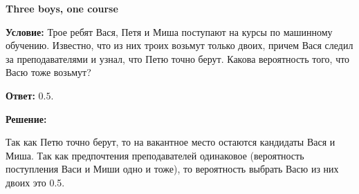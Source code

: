 \documentclass{exam}
\begin{document}
    
\textbf{Three boys, one course}

\textbf{Условие:} Трое ребят Вася, Петя и Миша поступают на курсы по машинному обучению. Известно, что из них троих возьмут только двоих, причем Вася следил за преподавателями и узнал, что Петю точно берут. Какова вероятность того, что Васю тоже возьмут?

\textbf{Ответ:} $0.5$.

\textbf{Решение:}

Так как Петю точно берут, то на вакантное место остаются кандидаты Вася и Миша. Так как предпочтения преподавателей одинаковое (вероятность поступления Васи и Миши одно и тоже), то вероятность выбрать Васю из них двоих это 0.5.
\end{document}
